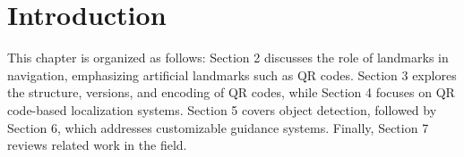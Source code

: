 \section{Introduction}


This chapter is organized as follows: Section 2 discusses the role of landmarks in navigation, emphasizing artificial landmarks such as QR codes. Section 3 explores the structure, versions, and encoding of QR codes, while Section 4 focuses on QR code-based localization systems. Section 5 covers object detection, followed by Section 6, which addresses customizable guidance systems. Finally, Section 7 reviews related work in the field.